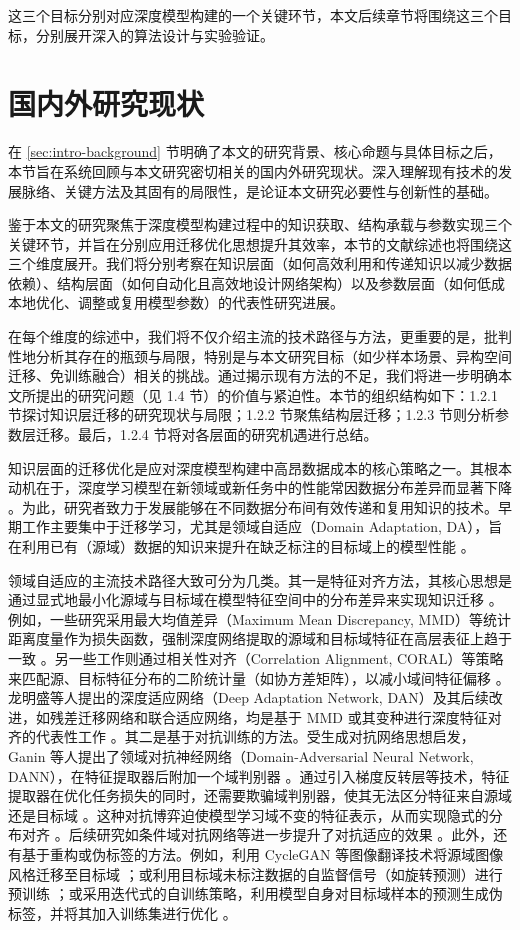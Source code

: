 \documentclass[../main.tex]{subfiles}
\begin{document}
这三个目标分别对应深度模型构建的一个关键环节，本文后续章节将围绕这三个目标，分别展开深入的算法设计与实验验证。

\section[\hspace{-2pt}国内外研究现状]{{\heiti{}\hspace{-8pt}国内外研究现状}}
\label{sec:intro-review}

在 \ref{sec:intro-background} 节明确了本文的研究背景、核心命题与具体目标之后，本节旨在系统回顾与本文研究密切相关的国内外研究现状。深入理解现有技术的发展脉络、关键方法及其固有的局限性，是论证本文研究必要性与创新性的基础。

鉴于本文的研究聚焦于深度模型构建过程中的知识获取、结构承载与参数实现三个关键环节，并旨在分别应用迁移优化思想提升其效率，本节的文献综述也将围绕这三个维度展开。我们将分别考察在知识层面（如何高效利用和传递知识以减少数据依赖）、结构层面（如何自动化且高效地设计网络架构）以及参数层面（如何低成本地优化、调整或复用模型参数）的代表性研究进展。

在每个维度的综述中，我们将不仅介绍主流的技术路径与方法，更重要的是，批判性地分析其存在的瓶颈与局限，特别是与本文研究目标（如少样本场景、异构空间迁移、免训练融合）相关的挑战。通过揭示现有方法的不足，我们将进一步明确本文所提出的研究问题（见 1.4 节）的价值与紧迫性。本节的组织结构如下：1.2.1 节探讨知识层迁移的研究现状与局限；1.2.2 节聚焦结构层迁移；1.2.3 节则分析参数层迁移。最后，1.2.4 节将对各层面的研究机遇进行总结。


知识层面的迁移优化是应对深度模型构建中高昂数据成本的核心策略之一。其根本动机在于，深度学习模型在新领域或新任务中的性能常因数据分布差异而显著下降 。为此，研究者致力于发展能够在不同数据分布间有效传递和复用知识的技术。早期工作主要集中于迁移学习，尤其是领域自适应（Domain Adaptation, DA），旨在利用已有（源域）数据的知识来提升在缺乏标注的目标域上的模型性能 。

领域自适应的主流技术路径大致可分为几类。其一是特征对齐方法，其核心思想是通过显式地最小化源域与目标域在模型特征空间中的分布差异来实现知识迁移 。例如，一些研究采用最大均值差异（Maximum Mean Discrepancy, MMD）等统计距离度量作为损失函数，强制深度网络提取的源域和目标域特征在高层表征上趋于一致 。另一些工作则通过相关性对齐（Correlation Alignment, CORAL）等策略来匹配源、目标特征分布的二阶统计量（如协方差矩阵），以减小域间特征偏移 。龙明盛等人提出的深度适应网络（Deep Adaptation Network, DAN）及其后续改进，如残差迁移网络和联合适应网络，均是基于 MMD 或其变种进行深度特征对齐的代表性工作 。其二是基于对抗训练的方法。受生成对抗网络思想启发，Ganin 等人提出了领域对抗神经网络（Domain-Adversarial Neural Network, DANN），在特征提取器后附加一个域判别器 。通过引入梯度反转层等技术，特征提取器在优化任务损失的同时，还需要欺骗域判别器，使其无法区分特征来自源域还是目标域 。这种对抗博弈迫使模型学习域不变的特征表示，从而实现隐式的分布对齐 。后续研究如条件域对抗网络等进一步提升了对抗适应的效果 。此外，还有基于重构或伪标签的方法。例如，利用 CycleGAN 等图像翻译技术将源域图像风格迁移至目标域 ；或利用目标域未标注数据的自监督信号（如旋转预测）进行预训练 ；或采用迭代式的自训练策略，利用模型自身对目标域样本的预测生成伪标签，并将其加入训练集进行优化 。
\end{document}
